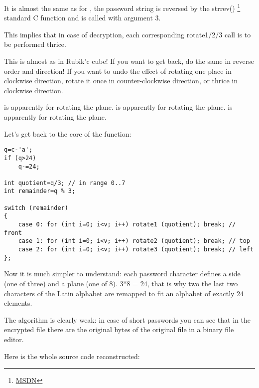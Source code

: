 It is almost the same as for ,  the password string is reversed by the
strrev() \footnote{\href{http://go.yurichev.com/17249}{MSDN}}
standard C function and  is called with argument 3. 

This implies that in case of decryption, each corresponding rotate1/2/3 call is to be performed thrice.

This is almost as in Rubik'c cube! 
If you want to get back, do the same in reverse order and direction! 
If you want to undo the effect of rotating one place in clockwise direction, 
rotate it once in counter-clockwise direction, or thrice in clockwise direction.

 is apparently for rotating the  plane. 
 is apparently for rotating the  plane. 
 is apparently for rotating the  plane.

Let's get back to the core of the  function:

\begin{lstlisting}[style=customc]
q=c-'a';
if (q>24)
	q-=24;

int quotient=q/3; // in range 0..7
int remainder=q % 3;

switch (remainder)
{
    case 0: for (int i=0; i<v; i++) rotate1 (quotient); break; // front
    case 1: for (int i=0; i<v; i++) rotate2 (quotient); break; // top
    case 2: for (int i=0; i<v; i++) rotate3 (quotient); break; // left
};
\end{lstlisting}

Now it is much simpler to understand: each password character defines a side (one of three) and a plane (one of 8). 
3*8 = 24, that is why two the last two characters of the Latin alphabet are remapped to fit an alphabet of exactly 
24 elements.

The algorithm is clearly weak: in case of short passwords you can see
that in the encrypted file there are 
the original bytes of the original file in a binary file editor.

Here is the whole source code reconstructed:



